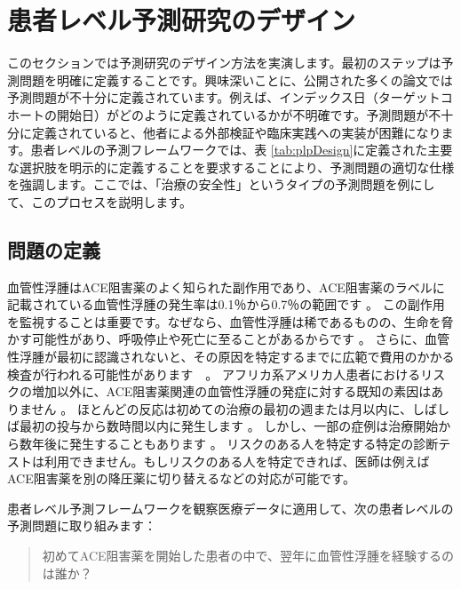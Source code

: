 \documentclass[
  11pt]{book}
\theoremstyle{definition}
\theoremstyle{definition}
\theoremstyle{definition}
\theoremstyle{definition}
\theoremstyle{remark}
\begin{document}
\section{患者レベル予測研究のデザイン}\label{ux60a3ux8005ux30ecux30d9ux30ebux4e88ux6e2cux7814ux7a76ux306eux30c7ux30b6ux30a4ux30f3}

このセクションでは予測研究のデザイン方法を実演します。最初のステップは予測問題を明確に定義することです。興味深いことに、公開された多くの論文では予測問題が不十分に定義されています。例えば、インデックス日（ターゲットコホートの開始日）がどのように定義されているかが不明確です。予測問題が不十分に定義されていると、他者による外部検証や臨床実践への実装が困難になります。患者レベルの予測フレームワークでは、表 \ref{tab:plpDesign}に定義された主要な選択肢を明示的に定義することを要求することにより、予測問題の適切な仕様を強調します。ここでは、「治療の安全性」というタイプの予測問題を例にして、このプロセスを説明します。 

\subsection{問題の定義}\label{ux554fux984cux306eux5b9aux7fa9-2}

血管性浮腫はACE阻害薬のよく知られた副作用であり、ACE阻害薬のラベルに記載されている血管性浮腫の発生率は0.1％から0.7％の範囲です \citep{byrd_2006}。 この副作用を監視することは重要です。なぜなら、血管性浮腫は稀であるものの、生命を脅かす可能性があり、呼吸停止や死亡に至ることがあるからです \citep{norman_2013}。 さらに、血管性浮腫が最初に認識されないと、その原因を特定するまでに広範で費用のかかる検査が行われる可能性があります　\citep{norman_2013, thompson_1993}。 アフリカ系アメリカ人患者におけるリスクの増加以外に、ACE阻害薬関連の血管性浮腫の発症に対する既知の素因はありません \citep{byrd_2006}。 ほとんどの反応は初めての治療の最初の週または月以内に、しばしば最初の投与から数時間以内に発生します \citep{circardi_2004}。 しかし、一部の症例は治療開始から数年後に発生することもあります \citep{mara_1996}。 リスクのある人を特定する特定の診断テストは利用できません。もしリスクのある人を特定できれば、医師は例えばACE阻害薬を別の降圧薬に切り替えるなどの対応が可能です。  

患者レベル予測フレームワークを観察医療データに適用して、次の患者レベルの予測問題に取り組みます：

\begin{quote}
初めてACE阻害薬を開始した患者の中で、翌年に血管性浮腫を経験するのは誰か？
\end{quote}
\end{document}
